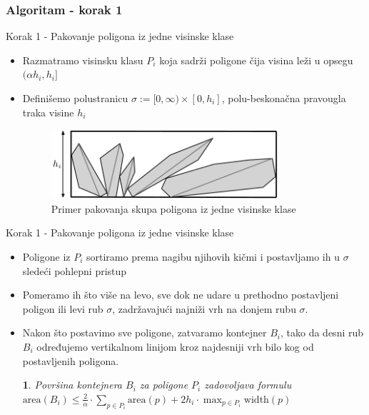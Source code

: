 \documentclass{beamer}
\theoremstyle{plain}
\newcommand{\thistheoremname}{}
\newtheorem{genericthm}[thm]{\thistheoremname}
\newenvironment{namedthm}[1]
  {\renewcommand{\thistheoremname}{#1}%
   \begin{genericthm}}
  {\end{genericthm}}
\begin{document}
\subsubsection{Algoritam - korak 1}
\begin{frame}{Korak 1 - Pakovanje poligona iz jedne visinske klase}
\begin{itemize}
    \item Razmatramo visinsku klasu $P_i$ koja sadrži poligone čija visina leži u opsegu $(\alpha h_i, h_i]$
    \item Definišemo polustranicu $\sigma := [0, \infty) \times [0, h_i]$, polu-beskonačna pravougla traka visine $h_i$
    \captionsetup[figure]{justification=centering, , labelsep=colon, skip=4pt}
    \begin{figure}
        \centering
        \includegraphics[width=0.8\textwidth]{slika1.png}
        \caption{Primer pakovanja skupa poligona iz jedne visinske klase}
    \end{figure}
    
    
\end{itemize}
\end{frame}

\begin{frame}{Korak 1 - Pakovanje poligona iz jedne visinske klase}
\begin{itemize}
    \item Poligone iz $P_i$ sortiramo prema nagibu njihovih kičmi i postavljamo ih u $\sigma$ sledeći pohlepni pristup
    \item Pomeramo ih što više na levo, sve dok ne udare u prethodno postavljeni poligon ili levi rub $\sigma$, zadržavajući najniži vrh na donjem rubu $\sigma$.
    \item Nakon što postavimo sve poligone, zatvaramo kontejner $B_i$, tako da desni rub $B_i$ određujemo vertikalnom linijom kroz najdesniji vrh bilo kog od postavljenih poligona.
    \begin{namedthm}{Lema 1.}
        Površina kontejnera $B_i$ za poligone $P_i$ zadovoljava formulu $\text{area}(B_i) \leq \frac{2}{\alpha} \cdot \sum_{p \in P_i} \text{area}(p) + 2h_i \cdot \max_{p \in P_i} \text{width}(p)$
    \end{namedthm}
\end{itemize}
\end{frame}
\end{document}
